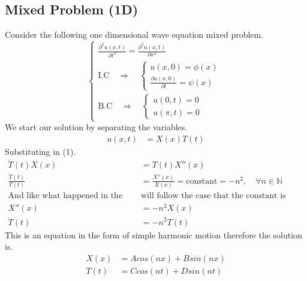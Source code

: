 \subsection{Mixed Problem (1D)}
Consider the following one dimensional wave equation mixed problem.
\begin{equation}
    \begin{cases}
        \displaystyle \frac{\partial^2 u\left(x,t\right)}{\partial t^2}=\frac{\partial^2 u\left(x,t\right)}{\partial x^2}
        \\
        \text{I.C} \quad \Longrightarrow \quad 
        \begin{cases}
            u\left(x,0 \right) = \phi\left(x\right)
            \\
            \displaystyle \frac{\partial u\left(x,0 \right)}{\partial t} = \psi\left(x\right)
        \end{cases}
        \\
        \text{B.C} \quad \Longrightarrow \quad 
        \begin{cases}
            u\left(0,t \right) = 0
            \\
            u\left(\pi,t\right)=0
        \end{cases}   
    \end{cases}
\end{equation}
We start our solution by separating the variables.
\begin{align}
u\left(x,t\right) &= X\left(x\right)T\left(t\right)
\end{align}
Substituting in (1).
\begin{align*}
\ddot{T}\left(t\right)X\left(x\right)&=T\left(t\right)X''\left(x\right)
\\
\frac{\ddot{T}\left(t\right)}{T\left(t\right)} &= \frac{X''\left(x\right)}{X\left(x\right)}= \text{constant} = - n^2,\quad \forall n \in \mathbb{N}
\\
\text{And like what happened in the heat equation we }&\text{will follow the case that the constant is negative}
\\
X''\left(x\right)&=-n^2 X\left(x\right)
\\
\ddot{T}\left(t\right) &= -n^2 T\left(t\right)
\end{align*}
This is an equation in the form of simple harmonic motion therefore the solution is.
\begin{align*}
X\left(x\right) &= Acos\left(nx\right)+Bsin\left(nx\right)
\\
T\left(t\right) &= Ccos\left(nt\right)+Dsin\left(nt\right)
\end{align*}

